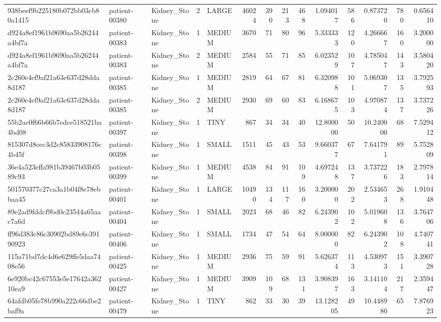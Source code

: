 \begin{tabular}{lllrlrrrrrrrrr}
938beef9b225180b072bb03cb80a1415 & patient-00380 & Kidney_Stone & 2 & LARGE & 46024 & 390 & 213 & 468 & 1.094017 & 586 & 0.873720 & 780 & 0.656410 \\
d924a8ef1961b9690aa5b26244a4bf7a & patient-00383 & Kidney_Stone & 1 & MEDIUM & 3670 & 71 & 80 & 96 & 5.333333 & 120 & 4.266667 & 160 & 3.200000 \\
d924a8ef1961b9690aa5b26244a4bf7a & patient-00383 & Kidney_Stone & 2 & MEDIUM & 2584 & 55 & 71 & 85 & 6.023529 & 107 & 4.785047 & 143 & 3.580420 \\
2c260e4ef9af21a63c637d28dda8d187 & patient-00385 & Kidney_Stone & 1 & MEDIUM & 2819 & 64 & 67 & 81 & 6.320988 & 101 & 5.069307 & 135 & 3.792593 \\
2c260e4ef9af21a63c637d28dda8d187 & patient-00385 & Kidney_Stone & 2 & MEDIUM & 2930 & 69 & 60 & 83 & 6.168675 & 103 & 4.970874 & 137 & 3.737226 \\
55b2ac0f66b66b7edce518521ba4bd08 & patient-00397 & Kidney_Stone & 1 & TINY & 867 & 34 & 34 & 40 & 12.800000 & 50 & 10.240000 & 68 & 7.529412 \\
815307d8cec3d2c85833908176c4b45f & patient-00398 & Kidney_Stone & 1 & SMALL & 1511 & 45 & 43 & 53 & 9.660377 & 67 & 7.641791 & 89 & 5.752809 \\
36e4a523effa981b39467b03b0589c93 & patient-00399 & Kidney_Stone & 1 & MEDIUM & 4538 & 84 & 91 & 109 & 4.697248 & 137 & 3.737226 & 183 & 2.797814 \\
501570377c27ca3a1b04f8e78ebbaa45 & patient-00401 & Kidney_Stone & 1 & LARGE & 10490 & 134 & 117 & 160 & 3.200000 & 202 & 2.534653 & 268 & 1.910448 \\
89e2ad9fddcf9bd0c23544a65aac7a6d & patient-00404 & Kidney_Stone & 1 & SMALL & 2023 & 68 & 46 & 82 & 6.243902 & 102 & 5.019608 & 136 & 3.764706 \\
ff96d383c86c30902bd89e6c39190923 & patient-00406 & Kidney_Stone & 1 & SMALL & 1734 & 47 & 54 & 64 & 8.000000 & 82 & 6.243902 & 108 & 4.740741 \\
115a71bd7dc4d6e629ffe5daa7408e56 & patient-00425 & Kidney_Stone & 1 & MEDIUM & 2936 & 75 & 59 & 91 & 5.626374 & 113 & 4.530973 & 151 & 3.390728 \\
6e920bc42c67553e5e17642a36210ea9 & patient-00427 & Kidney_Stone & 1 & MEDIUM & 3909 & 109 & 68 & 131 & 3.908397 & 163 & 3.141104 & 217 & 2.359447 \\
64afdb05fe78b990a222c66dbe2baf9a & patient-00479 & Kidney_Stone & 1 & TINY & 862 & 33 & 30 & 39 & 13.128205 & 49 & 10.448980 & 65 & 7.876923 \\

\end{tabular}
